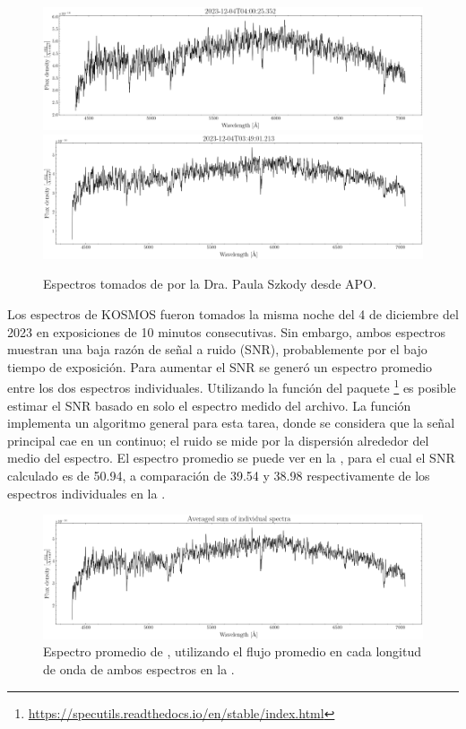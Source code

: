 \begin{figure}[!ht]
    \centering
    \includegraphics[scale=0.4]{Conclusion/Figures/Figura APO Spectrum 2.png}
    \includegraphics[scale=0.4]{Conclusion/Figures/Figura APO Spectrum 1.png}
    \caption{Espectros tomados de \atoObjId por la Dra. Paula Szkody desde APO.}
    \label{figuraEspectrosApo}
\end{figure}

Los espectros de KOSMOS fueron tomados la misma noche del 4 de diciembre del
2023 en exposiciones de 10 minutos consecutivas. Sin embargo, ambos espectros
muestran una baja razón de señal a ruido (SNR), probablemente por el bajo tiempo
de exposición. Para aumentar el SNR se generó un espectro promedio entre los dos
espectros individuales. Utilizando la función  del paquete
\footnote{\url{https://specutils.readthedocs.io/en/stable/index.html}}
es posible estimar el SNR basado en solo el espectro medido del archivo. La
función  implementa un algoritmo general para esta tarea,
donde se considera que la señal principal cae en un continuo; el ruido se mide
por la dispersión alrededor del medio del espectro. El espectro promedio se
puede ver en la , para el cual el SNR
calculado es de 50.94, a comparación de 39.54 y 38.98 respectivamente de los
espectros individuales en la .

\begin{figure}[!ht]
    \centering
    \includegraphics[scale=0.4]{Conclusion/Figures/Figura APO Spectrum Average.png}
    \caption{Espectro promedio de \atoObjIdNoSpace, utilizando el flujo promedio en cada longitud de onda de ambos espectros en la .}
    \label{figuraEspectroApoPromedio}
\end{figure}

